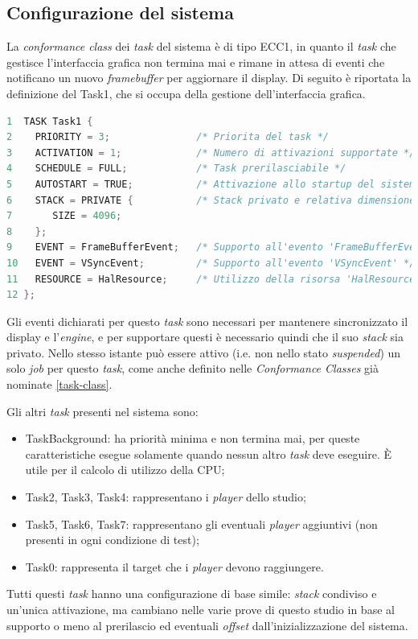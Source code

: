 \documentclass{article}
\begin{document}
\subsection{Configurazione del sistema}
La \textit{conformance class} dei \textit{task} del sistema è di tipo ECC1, in quanto il \textit{task} che gestisce l'interfaccia grafica non termina mai e rimane in attesa di eventi che notificano un nuovo \textit{framebuffer} per aggiornare il display.
Di seguito è riportata la definizione del Task1, che si occupa della gestione dell'interfaccia grafica.
\begin{lstlisting}[language=C]
1  TASK Task1 {
2	 PRIORITY = 3;               /* Priorita del task */
3	 ACTIVATION = 1;             /* Numero di attivazioni supportate */
4	 SCHEDULE = FULL;            /* Task prerilasciabile */
5	 AUTOSTART = TRUE;           /* Attivazione allo startup del sistema */
6	 STACK = PRIVATE {           /* Stack privato e relativa dimensione */
7	 	SIZE = 4096;
8	 };
9	 EVENT = FrameBufferEvent;   /* Supporto all'evento 'FrameBufferEvent' */
10	 EVENT = VSyncEvent;         /* Supporto all'evento 'VSyncEvent' */
11	 RESOURCE = HalResource;     /* Utilizzo della risorsa 'HalResource' */
12 };
\end{lstlisting}
Gli eventi dichiarati per questo \textit{task} sono necessari per mantenere sincronizzato il display e l'\textit{engine}, e per supportare questi è necessario quindi che il suo \textit{stack} sia privato. Nello stesso istante può essere attivo (i.e. non nello stato \textit{suspended}) un solo \textit{job} per questo \textit{task}, come anche definito nelle \textit{Conformance Classes} già nominate \ref{task-class}. 

Gli altri \textit{task} presenti nel sistema sono:
\begin{itemize}
	\item TaskBackground: ha priorità minima e non termina mai, per queste caratteristiche esegue solamente quando nessun altro \textit{task} deve eseguire. È utile per il calcolo di utilizzo della CPU;
	\item Task2, Task3, Task4: rappresentano i \textit{player} dello studio;
	\item Task5, Task6, Task7: rappresentano gli eventuali \textit{player} aggiuntivi (non presenti in ogni condizione di test);
	\item Task0: rappresenta il target che i \textit{player} devono raggiungere.
\end{itemize}
Tutti questi \textit{task} hanno una configurazione di base simile: \textit{stack} condiviso e un'unica attivazione, ma cambiano nelle varie prove di questo studio in base al supporto o meno al prerilascio ed eventuali \textit{offset} dall'inizializzazione del sistema.
\end{document}

